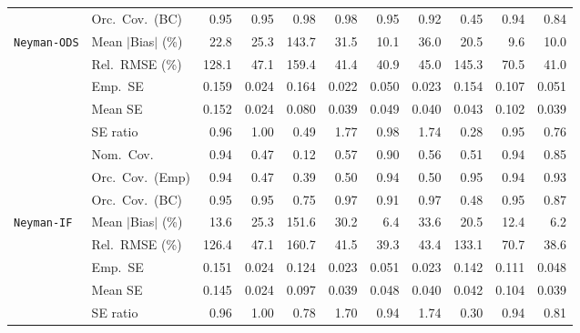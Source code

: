 \begin{landscape}
\begin{longtable}{llrrrrrrrrr}
 & Orc.\ Cov.\ (BC) & \cellcolor{rankone}0.95 & \cellcolor{ranktwo}0.95 & \cellcolor{rankthree}0.98 & \cellcolor{rankthree}0.98 & \cellcolor{rankone}0.95 & \cellcolor{rankthree}0.92 & 0.45 & \cellcolor{ranktwo}0.94 & 0.84 \\
\addlinespace[2pt]
\quad \texttt{Neyman-ODS} & Mean $|$Bias$|$ (\%) & 22.8 & 25.3 & 143.7 & 31.5 & \cellcolor{rankthree}10.1 & 36.0 & 20.5 & \cellcolor{rankone}9.6 & \cellcolor{ranktwo}10.0 \\
 & Rel.\ RMSE (\%) & 128.1 & 47.1 & 159.4 & \cellcolor{rankthree}41.4 & \cellcolor{rankone}40.9 & 45.0 & 145.3 & 70.5 & \cellcolor{ranktwo}41.0 \\
 & Emp.\ SE & 0.159 & 0.024 & 0.164 & 0.022 & 0.050 & 0.023 & 0.154 & 0.107 & 0.051 \\
 & Mean SE & 0.152 & 0.024 & 0.080 & 0.039 & 0.049 & 0.040 & 0.043 & 0.102 & 0.039 \\
 & SE ratio & \cellcolor{rankthree}0.96 & \cellcolor{rankone}1.00 & 0.49 & 1.77 & \cellcolor{ranktwo}0.98 & 1.74 & 0.28 & 0.95 & 0.76 \\
 & Nom.\ Cov. & \cellcolor{rankone}0.94 & 0.47 & 0.12 & 0.57 & \cellcolor{ranktwo}0.90 & 0.56 & 0.51 & \cellcolor{rankone}0.94 & \cellcolor{rankthree}0.85 \\
 & Orc.\ Cov.\ (Emp) & \cellcolor{ranktwo}0.94 & 0.47 & 0.39 & 0.50 & \cellcolor{ranktwo}0.94 & 0.50 & \cellcolor{rankone}0.95 & \cellcolor{ranktwo}0.94 & \cellcolor{rankthree}0.93 \\
 & Orc.\ Cov.\ (BC) & \cellcolor{rankone}0.95 & \cellcolor{ranktwo}0.95 & 0.75 & \cellcolor{rankthree}0.97 & 0.91 & 0.97 & 0.48 & \cellcolor{rankone}0.95 & 0.87 \\
\addlinespace[2pt]
\quad \texttt{Neyman-IF} & Mean $|$Bias$|$ (\%) & 13.6 & 25.3 & 151.6 & 30.2 & \cellcolor{ranktwo}6.4 & 33.6 & 20.5 & \cellcolor{rankthree}12.4 & \cellcolor{rankone}6.2 \\
 & Rel.\ RMSE (\%) & 126.4 & 47.1 & 160.7 & \cellcolor{rankthree}41.5 & \cellcolor{ranktwo}39.3 & 43.4 & 133.1 & 70.7 & \cellcolor{rankone}38.6 \\
 & Emp.\ SE & 0.151 & 0.024 & 0.124 & 0.023 & 0.051 & 0.023 & 0.142 & 0.111 & 0.048 \\
 & Mean SE & 0.145 & 0.024 & 0.097 & 0.039 & 0.048 & 0.040 & 0.042 & 0.104 & 0.039 \\
 & SE ratio & \cellcolor{ranktwo}0.96 & \cellcolor{rankone}1.00 & 0.78 & 1.70 & \cellcolor{rankthree}0.94 & 1.74 & 0.30 & \cellcolor{rankthree}0.94 & 0.81 \\

\end{longtable}
\end{landscape}
